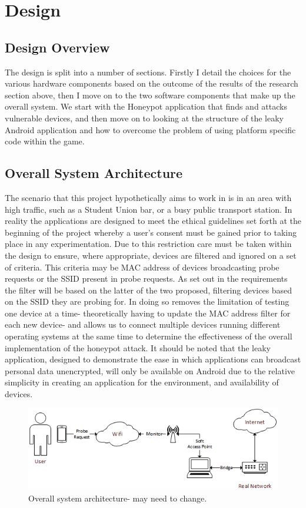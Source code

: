 \section{Design}
\subsection{Design Overview}
The design is split into a number of sections. Firstly I detail the choices for the various hardware components based on the outcome of the results of the research section above, then I move on to the two software components that make up the overall system. We start with the Honeypot application that finds and attacks vulnerable devices, and then move on to looking at the structure of the leaky Android application and how to overcome the problem of using platform specific code within the game. 
\subsection{Overall System Architecture}
The scenario that this project hypothetically aims to work in is in an area with high traffic, such as a Student Union bar, or a busy public transport station. In reality the applications are designed to meet the ethical guidelines set forth at the beginning of the project whereby a user's consent must be gained prior to taking place in any experimentation. Due to this restriction care must be taken within the design to ensure, where appropriate, devices are filtered and ignored on a set of criteria. This criteria may be MAC address of devices broadcasting probe requests or the SSID present in probe requests. As set out in the requirements the filter will be based on the latter of the two proposed, filtering devices based on the SSID they are probing for. In doing so removes the limitation of testing one device at a time- theoretically having to update the MAC address filter for each new device- and allows us to connect multiple devices running different operating systems at the same time to determine the effectiveness of the overall implementation of the honeypot attack. It should be noted that the leaky application, designed to demonstrate the ease in which applications can broadcast personal data unencrypted, will only be available on Android due to the relative simplicity in creating an application for the environment, and availability of devices. 

\begin{figure}[h!]
\centering\includegraphics[width=\linewidth]{design/figures/overall.png}
\caption{Overall system architecture- may need to change.}
\end{figure}

